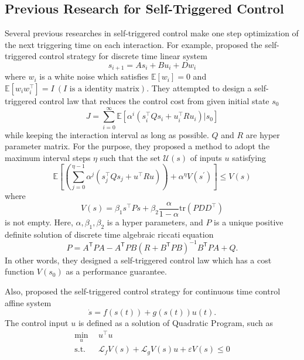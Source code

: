 \documentclass[english, dvipdfmx]{ampmt}             %
\newcommand{\expect}{\mathbb{E}}
\begin{document}
\subsection{Previous Research for Self-Triggered Control}
Several previous researches in self-triggered control make one step optimization of the next triggering time on each interaction. For example, \cite{STC} proposed the self-triggered control strategy for discrete time linear system
\begin{equation*}
	s_{i+1} = As_i + Bu_i + Dw_i
\end{equation*}
where $w_i$ is a white noise which satisfies $\expect[w_i] = 0$ and $\expect[w_iw_i^{\top}]=I~(I  \textrm{ is a identity matrix})$.
They attempted to design a self-triggered control law that reduces the control cost from given initial state $s_0$
\begin{equation*}
	J = \sum_{i = 0}^{\infty}\expect[\alpha^i(s_i^{\top}Qs_i+u_i^{\top}Ru_i)|s_0]
\end{equation*}
while keeping the interaction interval as long as possible. $Q$ and $R$ are hyper parameter matrix. For the purpose, they proposed a method to adopt the maximum interval steps $\eta$ such that 
the set $\mathcal{U}(s)$ of inputs $u$ satisfying
\begin{equation*}
	\expect[(\sum_{j=0}^{\eta-1}\alpha^{j}(s_j^{\top}Qs_j+u^{\top}Ru))+\alpha^{\eta}V(s^{\prime})] \leq V(s)
\end{equation*}
where
\begin{equation*}
	V(s) = \beta_1s^{\top}Ps + \beta_2\frac{\alpha}{1-\alpha}\textrm{tr}(PDD^{\top})
\end{equation*}
is not empty. Here, $\alpha, \beta_1, \beta_2$ is a hyper parameters, and $P$ is a unique positive definite solution of discrete time algebraic riccati equation 
\begin{equation*}
	P = A^\mathsf{T}PA-A^\mathsf{T}PB\left(R+B^\mathsf{T}PB\right)^{-1}B^\mathsf{T}PA+Q.
\end{equation*}
In other words, they designed a self-triggered control law which has a cost function $V(s_0)$ as a performance guarantee. \par
Also, \cite{ECBF} proposed the self-triggered control strategy for continuous time control affine system 
\begin{equation*}
	\dot{s} = f(s(t)) + g(s(t))u(t).
\end{equation*}
The control input $u$ is defined as a solution of Quadratic Program, such as
\begin{align*}
	\min_{u}~~&u^{\top}u \\
	\textrm{s.t.}~~&\mathcal{L}_fV(s)+\mathcal{L}_gV(s)u+\varepsilon V(s)\leq 0
\end{align*}
\end{document}
